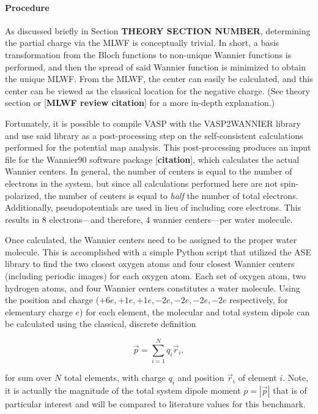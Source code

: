     \paragraph{Procedure} As discussed briefly in Section \textbf{THEORY SECTION NUMBER}, determining the partial charge via the MLWF is conceptually trivial. In short, a basis transformation from the Bloch functions to non-unique Wannier functions is performed, and then the spread of said Wannier function is minimized to obtain the unique MLWF. From the MLWF, the center can easily be calculated, and this center can be viewed as the classical location for the negative charge. (See theory section or [\textbf{MLWF review citation}] for a more in-depth explanation.) 
    
    Fortunately, it is possible to compile VASP with the VASP2WANNIER library and use said library as a post-processing step on the self-consistent calculations performed for the potential map analysis. This post-processing produces an input file for the Wannier90 software package [\textbf{citation}], which calculates the actual Wannier centers. In general, the number of centers is equal to the number of electrons in the system, but since all calculations performed here are not spin-polarized, the number of centers is equal to \textit{half} the number of total electrons. Additionally, pseudopotentials are used in lieu of including core electrons. This results in 8 electrons---and therefore, 4 wannier centers---per water molecule.
    
    Once calculated, the Wannier centers need to be assigned to the proper water molecule. This is accomplished with a simple Python script that utilized the ASE library to find the two closest oxygen atoms and four closest Wannier centers (including periodic images) for each oxygen atom. Each set of oxygen atom, two hydrogen atoms, and four Wannier centers constitutes a water molecule. Using the position and charge ($+6e, +1e, +1e, -2e, -2e, -2e, -2e$ respectively, for elementary charge $e$) for each element, the molecular and total system dipole can be calculated using the classical, discrete definition
    
    \begin{equation}
    \label{eq:dipole_def}
        \Vec{p} = \sum\limits_{i=1}^{N} q_i \Vec{r}_i,
    \end{equation}
    
    \noindent for sum over $N$ total elements, with charge $q_i$ and position $\Vec{r}_i$ of element $i$. Note, it is actually the magnitude of the total system dipole moment $ p = |\Vec{p}|$ that is of particular interest and will be compared to literature values for this benchmark.
    
